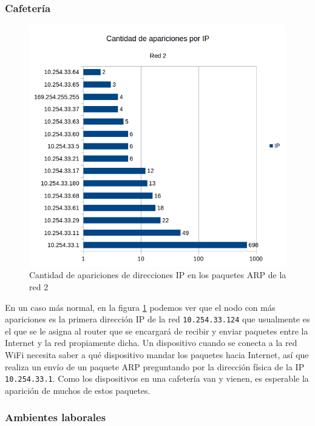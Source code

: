\subsubsection{Cafetería}

\begin{figure}[H]
	\centering
	\includegraphics[scale=0.65]{imgs/red2_identificar.png}
	\caption{Cantidad de apariciones de direcciones IP en los paquetes ARP de la red 2}
      \label{red2_identificar}
\end{figure}

En un caso más normal, en la figura \ref{red2_identificar} podemos ver que el nodo con más apariciones es la primera dirección IP de la red \texttt{10.254.33.1\/24} que usualmente es el que se le asigna al router que se encargará de recibir y enviar paquetes entre la Internet y la red propiamente dicha. Un dispositivo cuando se conecta a la red WiFi necesita saber a qué dispositivo mandar los paquetes hacia Internet, así que realiza un envío de un paquete ARP preguntando por la dirección física de la IP \texttt{10.254.33.1}. Como los dispositivos en una cafetería van y vienen, es esperable la aparición de muchos de estos paquetes.

\subsubsection{Ambientes laborales}

